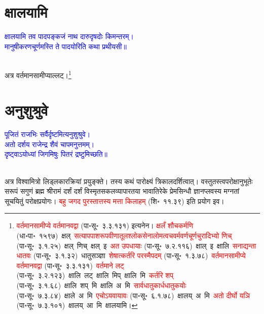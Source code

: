\section[क्षालयामि]{क्षालयामि}
\centering\textcolor{blue}{क्षालयामि तव पादपङ्कजं नाथ दारुदृषदोः किमन्तरम्।\nopagebreak\\
मानुषीकरणचूर्णमस्ति ते पादयोरिति कथा प्रथीयसी॥}\nopagebreak\\
\\
\fontsize{14}{21}\selectfont\begin{sloppypar}\justifying\noindent\hspace{10mm} अत्र वर्तमान\-सामीप्याल्लट्।\footnote{\textcolor{red}{वर्तमान\-सामीप्ये वर्तमानवद्वा} (पा॰सू॰~३.३.१३१) इत्यनेन। \textcolor{red}{क्षलँ शौचकर्मणि} (धा॰पा॰~१५९७)~\arrow क्षल्~\arrow \textcolor{red}{सत्याप\-पाश\-रूप\-वीणा\-तूल\-श्लोक\-सेना\-लोम\-त्वच\-वर्म\-वर्ण\-चूर्ण\-चुरादिभ्यो णिच्} (पा॰सू॰~३.१.२५)~\arrow क्षल्~णिच्~\arrow क्षल्~इ~\arrow \textcolor{red}{अत उपधायाः} (पा॰सू॰~७.२.११६)~\arrow क्षाल्~इ~\arrow क्षालि~\arrow \textcolor{red}{सनाद्यन्ता धातवः} (पा॰सू॰~३.१.३२)~\arrow धातु\-सञ्ज्ञा~\arrow \textcolor{red}{शेषात्कर्तरि परस्मैपदम्} (पा॰सू॰~१.३.७८)~\arrow \textcolor{red}{वर्तमान\-सामीप्ये वर्तमानवद्वा} (पा॰सू॰~३.३.१३१)~\arrow \textcolor{red}{वर्तमाने लट्} (पा॰सू॰~३.२.१२३)~\arrow क्षालि~लट्~\arrow क्षालि~मिप्~\arrow क्षालि~मि~\arrow \textcolor{red}{कर्तरि शप्} (पा॰सू॰~३.१.६८)~\arrow क्षालि~शप्~मि~\arrow क्षालि~अ~मि~\arrow \textcolor{red}{सार्वधातुकार्धधातुकयोः} (पा॰सू॰~७.३.८४)~\arrow क्षाले~अ~मि~\arrow \textcolor{red}{एचोऽयवायावः} (पा॰सू॰~६.१.७८)~\arrow क्षालय्~अ~मि~\arrow \textcolor{red}{अतो दीर्घो यञि} (पा॰सू॰~७.३.१०१)~\arrow क्षालय्~आ~मि~\arrow क्षालयामि।}\end{sloppypar}
\section[अनुशुश्रुवे]{अनुशुश्रुवे}
\centering\textcolor{blue}{पूजितं राजभिः सर्वैर्दृष्टमित्यनुशुश्रुवे।\nopagebreak\\
अतो दर्शय राजेन्द्र शैवं चापमनुत्तमम्।\nopagebreak\\
दृष्ट्वाऽयोध्यां जिगमिषुः पितरं द्रष्टुमिच्छति॥}\nopagebreak\\
\\
\fontsize{14}{21}\selectfont\begin{sloppypar}\justifying\noindent\hspace{10mm} अत्र विश्वामित्रो लिड्लकार\-क्रियां प्रयुङ्क्ते। तस्य कथं पारोक्ष्यं त्रिकाल\-दर्शित्वात्। वस्तुतस्त्वपरोक्षानुभूतेः सरूपं सगुणं ब्रह्म श्रीरामं दर्शं दर्शं विस्मृत\-सकल\-व्यापारतया भावातिरेके प्रेम\-सिन्धौ ज्ञान\-प्लवस्य मग्नतां सूचयितुं परोक्ष\-प्रयोगः।
\textcolor{red}{बहु जगद पुरस्तात्तस्य मत्ता किलाहम्} (शि॰~११.३९) इति प्रयोग इव।\end{sloppypar}
